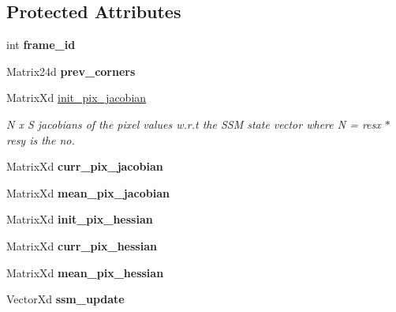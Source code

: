 \subsection*{Protected Attributes}
\begin{DoxyCompactItemize}
\item 
\hypertarget{classESM_adf2dd5b5bd4503409811737ca7fc2da9}{int {\bfseries frame\-\_\-id}}\label{classESM_adf2dd5b5bd4503409811737ca7fc2da9}

\item 
\hypertarget{classESM_a2f4ea2877a533a8f8baea61c68534604}{Matrix24d {\bfseries prev\-\_\-corners}}\label{classESM_a2f4ea2877a533a8f8baea61c68534604}

\item 
Matrix\-Xd \hyperlink{classESM_a94ba04c1951052b8d82377aff8aab97c}{init\-\_\-pix\-\_\-jacobian}
\begin{DoxyCompactList}\small\item\em N x S jacobians of the pixel values w.\-r.\-t the S\-S\-M state vector where N = resx $\ast$ resy is the no. \end{DoxyCompactList}\item 
\hypertarget{classESM_a3ffe05e2d3bb4bf5a35f74072c0b1d75}{Matrix\-Xd {\bfseries curr\-\_\-pix\-\_\-jacobian}}\label{classESM_a3ffe05e2d3bb4bf5a35f74072c0b1d75}

\item 
\hypertarget{classESM_a89876e6e8f509aa15ded3268198ea41a}{Matrix\-Xd {\bfseries mean\-\_\-pix\-\_\-jacobian}}\label{classESM_a89876e6e8f509aa15ded3268198ea41a}

\item 
\hypertarget{classESM_ae81ed47c90e85af190d2903a3134e413}{Matrix\-Xd {\bfseries init\-\_\-pix\-\_\-hessian}}\label{classESM_ae81ed47c90e85af190d2903a3134e413}

\item 
\hypertarget{classESM_a0e887fb0aca62133e62424698c3b1a57}{Matrix\-Xd {\bfseries curr\-\_\-pix\-\_\-hessian}}\label{classESM_a0e887fb0aca62133e62424698c3b1a57}

\item 
\hypertarget{classESM_a977b4b9eb8e19488971a7a5a5524c91d}{Matrix\-Xd {\bfseries mean\-\_\-pix\-\_\-hessian}}\label{classESM_a977b4b9eb8e19488971a7a5a5524c91d}

\item 
\hypertarget{classESM_ad201b8c5ce4833c07cc085a2b5a8d013}{Vector\-Xd {\bfseries ssm\-\_\-update}}\label{classESM_ad201b8c5ce4833c07cc085a2b5a8d013}


\end{DoxyCompactItemize}
